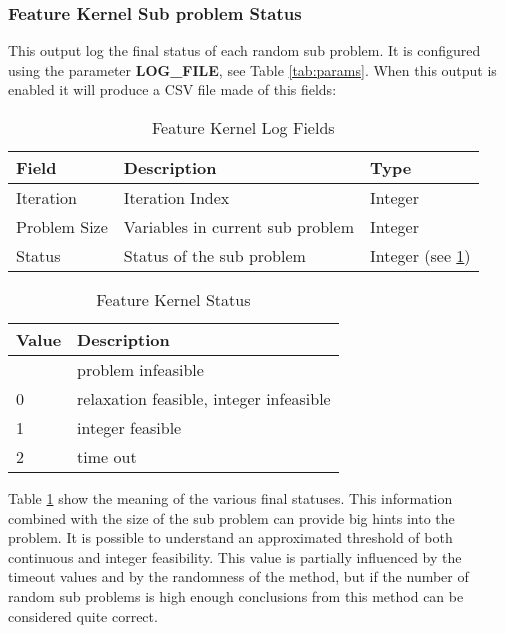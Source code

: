     \subsubsection{Feature Kernel Sub problem Status}
        This output log the final status of each random sub problem. It is configured using the parameter \textbf{LOG\_FILE}, see Table \ref{tab:params}. When this output
        is enabled it will produce a CSV file made of this fields:
        \begin{table}[h]
            \centering
            \caption{Feature Kernel Log Fields}
            \begin{tabular}{|l|l|l|}
                \hline
                Field & Description & Type \\
                \hline
                \hline
                Iteration & Iteration Index & Integer \\
                \hline
                Problem Size & Variables in current sub problem & Integer \\
                \hline
                Status & Status of the sub problem & Integer (see \ref{tab:fk-status}) \\
                \hline
            \end{tabular}
        \end{table}

        
        \begin{table}[h]
            \centering
            \caption{Feature Kernel Status}
            \begin{tabular}{|l|l|}
                \hline
                Value & Description \\
                \hline
                \hline
                & problem infeasible \\
                \hline
                0 & relaxation feasible, integer infeasible \\
                \hline
                1 & integer feasible \\
                \hline
                2 & time out \\
                \hline 
            \end{tabular}
            \label{tab:fk-status}
        \end{table}


        Table \ref{tab:fk-status} show the meaning of the various final statuses. This information combined with the size of the 
        sub problem can provide big hints into the problem. It is possible to understand an approximated threshold of both continuous 
        and integer feasibility. This value is partially influenced by the timeout values and by the randomness of the method, but if 
        the number of random sub problems is high enough conclusions from this method can be considered quite correct. 

